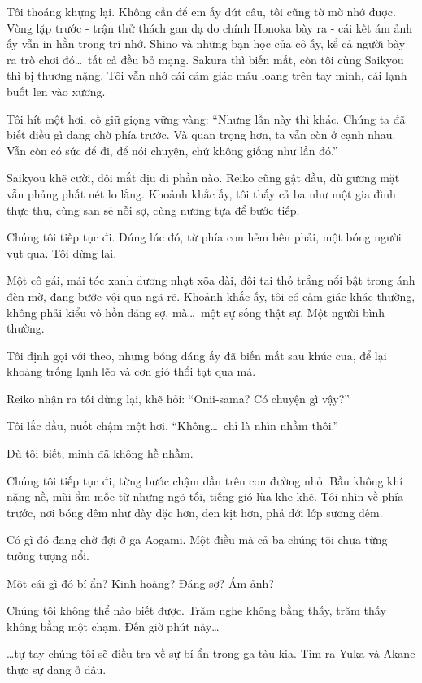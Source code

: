 \documentclass[../main.tex]{subfiles}
\begin{document}
Tôi thoáng khựng lại. Không cần để em ấy dứt câu, tôi cũng tờ mờ nhớ được. Vòng lặp trước - trận thử thách gan dạ do chính Honoka bày ra - cái kết ám ảnh ấy vẫn in hằn trong trí nhớ. Shino và những bạn học của cô ấy, kể cả người bày ra trò chơi đó\dots\ tất cả đều bỏ mạng. Sakura thì biến mất, còn tôi cùng Saikyou thì bị thương nặng. Tôi vẫn nhớ cái cảm giác máu loang trên tay mình, cái lạnh buốt len vào xương.

Tôi hít một hơi, cố giữ giọng vững vàng: ``Nhưng lần này thì khác. Chúng ta đã biết điều gì đang chờ phía trước. Và quan trọng hơn, ta vẫn còn ở cạnh nhau. Vẫn còn có sức để đi, để nói chuyện, chứ không giống như lần đó.''

Saikyou khẽ cười, đôi mắt dịu đi phần nào. Reiko cũng gật đầu, dù gương mặt vẫn phảng phất nét lo lắng. Khoảnh khắc ấy, tôi thấy cả ba như một gia đình thực thụ, cùng san sẻ nỗi sợ, cùng nương tựa để bước tiếp.

Chúng tôi tiếp tục đi. Đúng lúc đó, từ phía con hẻm bên phải, một bóng người vụt qua. Tôi dừng lại.

Một cô gái, mái tóc xanh dương nhạt xõa dài, đôi tai thỏ trắng nổi bật trong ánh đèn mờ, đang bước vội qua ngã rẽ. Khoảnh khắc ấy, tôi có cảm giác khác thường, không phải kiểu vô hồn đáng sợ, mà\dots\ một sự sống thật sự. Một người bình thường.

Tôi định gọi với theo, nhưng bóng dáng ấy đã biến mất sau khúc cua, để lại khoảng trống lạnh lẽo và cơn gió thổi tạt qua má.

Reiko nhận ra tôi dừng lại, khẽ hỏi:
``Onii-sama? Có chuyện gì vậy?''

Tôi lắc đầu, nuốt chậm một hơi.
``Không\dots\ chỉ là nhìn nhầm thôi.''

Dù tôi biết, mình đã không hề nhầm.

Chúng tôi tiếp tục đi, từng bước chậm dần trên con đường nhỏ. Bầu không khí nặng nề, mùi ẩm mốc từ những ngõ tối, tiếng gió lùa khe khẽ. Tôi nhìn về phía trước, nơi bóng đêm như dày đặc hơn, đen kịt hơn, phả dới lớp sương đêm.

Có gì đó đang chờ đợi ở ga Aogami. Một điều mà cả ba chúng tôi chưa từng tưởng tượng nổi.

Một cái gì đó bí ẩn? Kinh hoàng? Đáng sợ? Ám ảnh?

Chúng tôi không thể nào biết được. Trăm nghe không bằng thấy, trăm thấy không bằng một chạm. Đến giờ phút này\dots

\dots tự tay chúng tôi sẽ điều tra về sự bí ẩn trong ga tàu kia. Tìm ra Yuka và Akane thực sự đang ở đâu.
\end{document}
